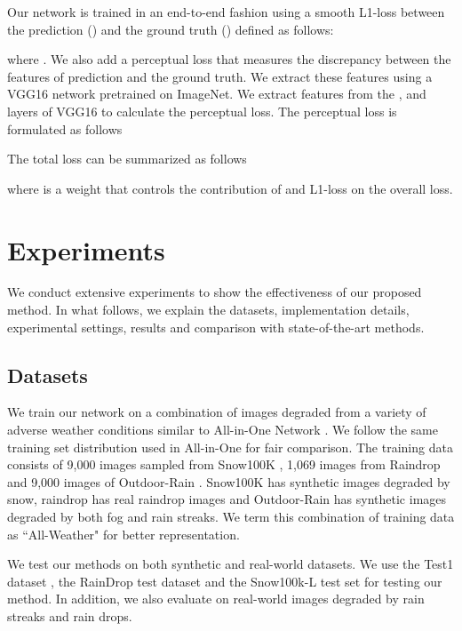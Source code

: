 \documentclass[10pt,twocolumn,letterpaper]{article}
\begin{document}
Our network is trained in an end-to-end fashion using a smooth L1-loss between the prediction () and the ground truth () defined as follows:

where . We also add a perceptual loss that measures the discrepancy between the features of prediction and the ground truth. We extract these features using a VGG16 network \cite{simonyan2014very}  pretrained on ImageNet. We extract features from the ,  and  layers of VGG16 to calculate the perceptual loss. The perceptual loss is formulated as  follows

The total loss can be summarized as follows

where  is a weight that controls the contribution of   and L1-loss on the overall loss.



\section{Experiments}

We conduct extensive experiments to show the effectiveness of our proposed method. In what follows, we explain the datasets, implementation details, experimental settings,  results and comparison with state-of-the-art methods.


\subsection{Datasets}
We train our network on a combination of images degraded from a variety of adverse weather conditions similar to All-in-One Network \cite{li2020all}. We follow the same training set distribution used in All-in-One for fair comparison. The training data consists of 9,000 images sampled from Snow100K \cite{liu2018desnownet}, 1,069 images from Raindrop \cite{qian2018attentive} and 9,000 images of Outdoor-Rain \cite{li2019heavy}. Snow100K has synthetic images degraded by snow, raindrop has real raindrop images and Outdoor-Rain has synthetic images degraded by both fog and rain streaks. We term this combination of training data as ``All-Weather" for better representation.

We test our methods on both synthetic and real-world datasets. We use the Test1 dataset \cite{li2020all, li2019heavy}, the RainDrop test dataset \cite{qian2018attentive} and the Snow100k-L test set \cite{liu2018desnownet} for testing our method. In addition, we also evaluate on real-world images degraded by rain streaks and rain drops.
\end{document}
